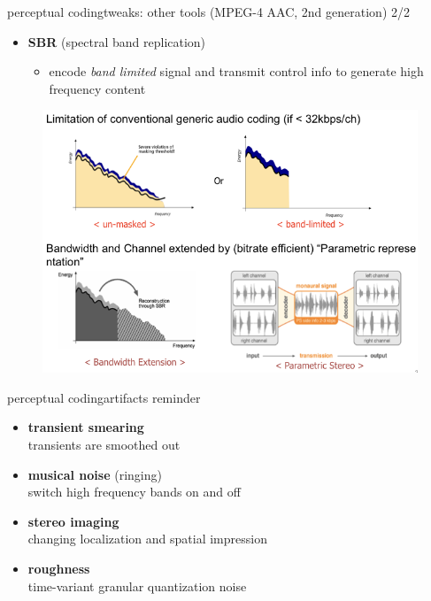     \begin{frame}{perceptual coding}{tweaks: other tools (MPEG-4 AAC, 2nd generation) 2/2}
        \vspace{-3mm}
        \begin{itemize}
            \item	\textbf{SBR} (spectral band replication)
                \begin{itemize}
                    \item encode \textit{band limited} signal and transmit control info to generate high frequency content
                \end{itemize}
		\end{itemize}
        \begin{figure}
            \includegraphics[scale=.5]{graph/sbr}
        \end{figure}
	\end{frame}
	
	\begin{frame}{perceptual coding}{artifacts reminder}
		\begin{itemize}
			\item	\textbf{transient smearing}\\
					transients are smoothed out
			\smallskip
            \item	\textbf{musical noise} (ringing)\\
					switch high frequency bands on and off
			\smallskip
            \item	\textbf{stereo imaging}\\
					changing localization and spatial impression
			\smallskip
            \item	\textbf{roughness}\\
					time-variant granular quantization noise
		\end{itemize}
	\end{frame}

